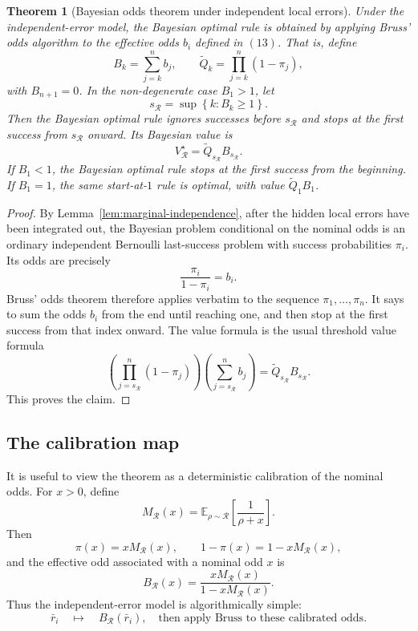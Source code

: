 \documentclass[11pt,a4paper]{article}
\newtheorem{theorem}{Theorem}
\begin{document}
\begin{theorem}[Bayesian odds theorem under independent local errors]
\label{thm:bayes-bruss}
Under the independent-error model, the Bayesian optimal rule is obtained by
applying Bruss' odds algorithm to the effective odds \(b_i\) defined in
\((13)\).  That is, define
\[
  B_k=\sum_{j=k}^n b_j,
  \qquad
  \widetilde Q_k=\prod_{j=k}^n(1-\pi_j),
\]
with $B_{n+1}=0$.  In the non-degenerate case $B_1>1$, let
\[
  s_{\mathcal R}
  =\sup\left\{k:B_k\ge1\right\}.
\]
Then the Bayesian optimal rule ignores successes before $s_{\mathcal R}$ and
stops at the first success from $s_{\mathcal R}$ onward.  Its Bayesian value is
\[
  \boxed{
  V_{\mathcal R}^{\star}
  =\widetilde Q_{s_{\mathcal R}}B_{s_{\mathcal R}}.
  }
  \tag{14}
\]
If $B_1<1$, the Bayesian optimal rule stops at the first success from the
beginning.  If $B_1=1$, the same start-at-\(1\) rule is optimal, with value
\(\widetilde Q_1B_1\).
\end{theorem}

\begin{proof}
By Lemma~\ref{lem:marginal-independence}, after the hidden local errors have
been integrated out, the Bayesian problem conditional on the nominal odds is an
ordinary independent Bernoulli last-success problem with success probabilities
$\pi_i$.  Its odds are precisely
\[
  \frac{\pi_i}{1-\pi_i}=b_i.
\]
Bruss' odds theorem therefore applies verbatim to the sequence
$\pi_1,
\dots,\pi_n$.  It says to sum the odds $b_i$ from the end until reaching one,
and then stop at the first success from that index onward.  The value formula is
the usual threshold value formula
\[
  \left(\prod_{j=s_{\mathcal R}}^n(1-\pi_j)\right)
  \left(\sum_{j=s_{\mathcal R}}^n b_j\right)
  =\widetilde Q_{s_{\mathcal R}}B_{s_{\mathcal R}}.
\]
This proves the claim.
\end{proof}

\subsection{The calibration map}

It is useful to view the theorem as a deterministic calibration of the nominal
odds.  For $x>0$, define
\[
  M_{\mathcal R}(x)
  =\mathbb E_{\rho\sim\mathcal R}\left[\frac1{\rho+x}\right].
\]
Then
\[
  \pi(x)=xM_{\mathcal R}(x),
  \qquad
  1-\pi(x)=1-xM_{\mathcal R}(x),
\]
and the effective odd associated with a nominal odd $x$ is
\[
  \boxed{
  B_{\mathcal R}(x)
  =\frac{xM_{\mathcal R}(x)}{1-xM_{\mathcal R}(x)}.
  }
  \tag{15}
\]
Thus the independent-error model is algorithmically simple:
\[
  \boxed{
  \bar r_i\quad\longmapsto\quad B_{\mathcal R}(\bar r_i),
  \quad\text{then apply Bruss to these calibrated odds.}
  }
\]
\end{document}
